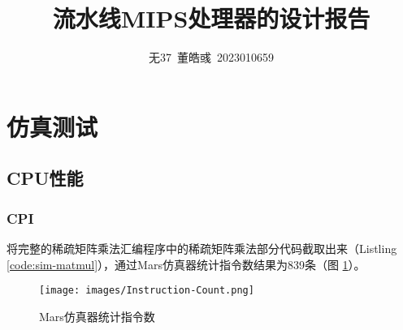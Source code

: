 \documentclass[utf8,twocolumn]{article}
\title{流水线MIPS处理器的设计报告}
\author{无37~董皓彧~2023010659}
\date{\zhtoday}
\begin{document}
\maketitle
\thispagestyle{fancy}


\section{仿真测试}
\subsection{CPU性能}
\subsubsection{CPI}
将完整的稀疏矩阵乘法汇编程序中的稀疏矩阵乘法部分代码截取出来（Listling \ref{code:sim-matmul}），通过Mars仿真器统计指令数结果为839条（图 \ref{fig:instruction-count}）。
\begin{figure}
    \centering
    \texttt{[image: images/Instruction-Count.png]}
    \caption{Mars仿真器统计指令数}
    \label{fig:instruction-count}
\end{figure}


\onecolumn
\appendix
% 
\end{document}
